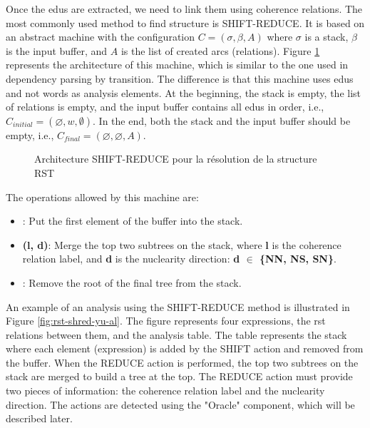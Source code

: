 \documentclass{KBook}
\begin{document}
Once the \acp{edu} are extracted, we need to link them using coherence relations. The most commonly used method to find  structure is SHIFT-REDUCE. It is based on an abstract machine with the configuration $C = (\sigma, \beta, A)$ where $\sigma$ is a stack, $\beta$ is the input buffer, and $A$ is the list of created arcs (relations). Figure \ref{fig:rst-shift-reduce} represents the architecture of this machine, which is similar to the one used in dependency parsing by transition. The difference is that this machine uses \acp{edu} and not words as analysis elements. At the beginning, the stack is empty, the list of relations is empty, and the input buffer contains all \acp{edu} in order, i.e., $C_{initial} = (\varnothing, w, \emptyset)$. In the end, both the stack and the input buffer should be empty, i.e., $C_{final} = (\varnothing, \varnothing, A)$.

\begin{figure}[!ht]
	\centering
	\caption{Architecture SHIFT-REDUCE pour la résolution de la structure RST}
	\label{fig:rst-shift-reduce}
\end{figure}


The operations allowed by this machine are:
\begin{itemize}
	\item {}: Put the first element of the buffer into the stack.
	\item {}\textbf{(l, d)}: Merge the top two subtrees on the stack, where \textbf{l} is the coherence relation label, and \textbf{d} is the nuclearity direction: \textbf{d $\in$ \{NN, NS, SN\}}.
	\item {}: Remove the root of the final tree from the stack.
\end{itemize}
%
An example of an  analysis using the SHIFT-REDUCE method is illustrated in Figure \ref{fig:rst-shred-yu-al}. The figure represents four expressions, the \ac{rst} relations between them, and the analysis table. The table represents the stack where each element (expression) is added by the SHIFT action and removed from the buffer. When the REDUCE action is performed, the top two subtrees on the stack are merged to build a tree at the top. The REDUCE action must provide two pieces of information: the coherence relation label and the nuclearity direction. The actions are detected using the "Oracle" component, which will be described later.


%	
\end{document}
